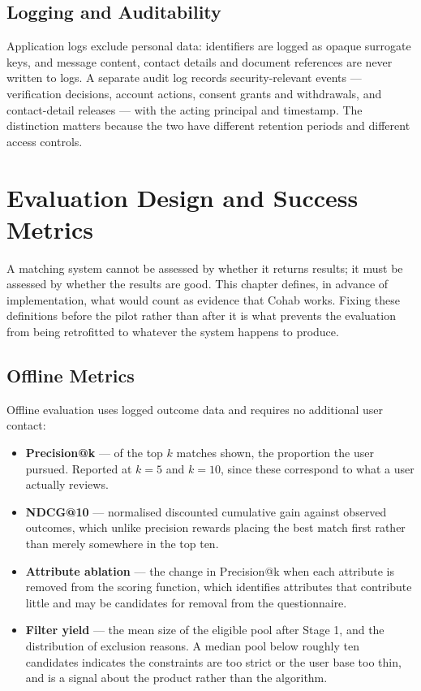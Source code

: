 \documentclass[12pt,a4paper]{report}
\begin{document}
\section{Logging and Auditability}

Application logs exclude personal data: identifiers are logged as opaque surrogate keys, and message content, contact details and document references are never written to logs. A separate audit log records security-relevant events --- verification decisions, account actions, consent grants and withdrawals, and contact-detail releases --- with the acting principal and timestamp. The distinction matters because the two have different retention periods and different access controls.

\chapter{Evaluation Design and Success Metrics}

A matching system cannot be assessed by whether it returns results; it must be assessed by whether the results are good. This chapter defines, in advance of implementation, what would count as evidence that Cohab works. Fixing these definitions before the pilot rather than after it is what prevents the evaluation from being retrofitted to whatever the system happens to produce.

\section{Offline Metrics}

Offline evaluation uses logged outcome data and requires no additional user contact:

\begin{itemize}[noitemsep]
    \item \textbf{Precision@k} --- of the top $k$ matches shown, the proportion the user pursued. Reported at $k = 5$ and $k = 10$, since these correspond to what a user actually reviews.
    \item \textbf{NDCG@10} --- normalised discounted cumulative gain against observed outcomes, which unlike precision rewards placing the best match first rather than merely somewhere in the top ten.
    \item \textbf{Attribute ablation} --- the change in Precision@k when each attribute is removed from the scoring function, which identifies attributes that contribute little and may be candidates for removal from the questionnaire.
    \item \textbf{Filter yield} --- the mean size of the eligible pool after Stage 1, and the distribution of exclusion reasons. A median pool below roughly ten candidates indicates the constraints are too strict or the user base too thin, and is a signal about the product rather than the algorithm.
\end{itemize}
\end{document}
